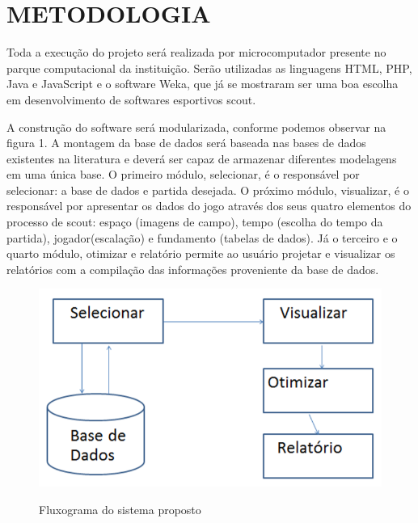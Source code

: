 \newpage
\section{METODOLOGIA}
Toda a execução do projeto será realizada por microcomputador presente no parque computacional da instituição. Serão utilizadas as linguagens HTML, PHP, Java e JavaScript e o software Weka, que já se mostraram ser uma boa escolha em desenvolvimento de softwares esportivos scout. 
 
A construção do software será modularizada, conforme podemos observar na figura 1. A montagem da base de dados será baseada nas bases de dados existentes na literatura e deverá ser capaz de armazenar diferentes modelagens em uma única base. O primeiro módulo, selecionar, é o responsável por selecionar: a base de dados e partida desejada. O próximo módulo, visualizar, é o responsável por apresentar os dados do jogo através dos seus quatro elementos do processo de scout: espaço (imagens de campo), tempo (escolha do tempo da partida), jogador(escalação) e fundamento (tabelas de dados). Já o terceiro e o quarto módulo, otimizar e relatório permite ao usuário projetar e visualizar os relatórios com a compilação das informações proveniente da base de dados.

\begin{figure}[htbp]
  \begin{center}
  \includegraphics[width=.5\linewidth]{imagens/fluxograma.png}\\
  \end{center}
  \caption[Fluxograma do sistema proposto]{Fluxograma do sistema proposto}
  \label{fig:logo}
\end{figure}